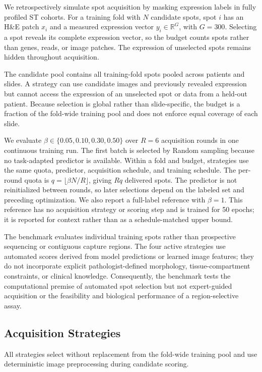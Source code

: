 \documentclass[]{spie}
\begin{document}
We retrospectively simulate spot acquisition by masking expression labels in fully profiled ST cohorts. For a training fold with $N$ candidate spots, spot $i$ has an H\&E patch $x_i$ and a measured expression vector $y_i\in\mathbb{R}^{G}$, with $G=300$. Selecting a spot reveals its complete expression vector, so the budget counts spots rather than genes, reads, or image patches. The expression of unselected spots remains hidden throughout acquisition.

The candidate pool contains all training-fold spots pooled across patients and slides. A strategy can use candidate images and previously revealed expression but cannot access the expression of an unselected spot or data from a held-out patient. Because selection is global rather than slide-specific, the budget is a fraction of the fold-wide training pool and does not enforce equal coverage of each slide.

We evaluate $\beta\in\{0.05,0.10,0.30,0.50\}$ over $R=6$ acquisition rounds in one continuous training run. The first batch is selected by Random sampling because no task-adapted predictor is available. Within a fold and budget, strategies use the same quota, predictor, acquisition schedule, and training schedule. The per-round quota is $q=\lfloor\beta N/R\rfloor$, giving $Rq$ delivered spots. The predictor is not reinitialized between rounds, so later selections depend on the labeled set and preceding optimization. We also report a full-label reference with $\beta=1$. This reference has no acquisition strategy or scoring step and is trained for 50 epochs; it is reported for context rather than as a schedule-matched upper bound.

The benchmark evaluates individual training spots rather than prospective sequencing or contiguous capture regions. The four active strategies use automated scores derived from model predictions or learned image features; they do not incorporate explicit pathologist-defined morphology, tissue-compartment constraints, or clinical knowledge. Consequently, the benchmark tests the computational premise of automated spot selection but not expert-guided acquisition or the feasibility and biological performance of a region-selective assay.

\subsection{Acquisition Strategies}
\label{sec:strategies}

All strategies select without replacement from the fold-wide training pool and use deterministic image preprocessing during candidate scoring.
\end{document}
